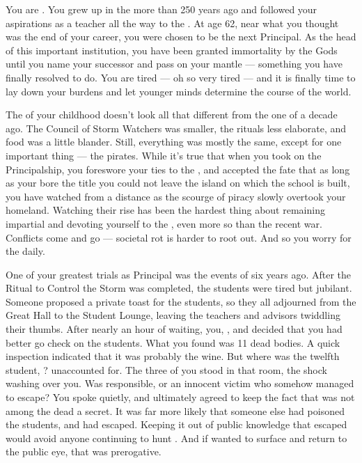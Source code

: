 \documentclass[char]{GL2020}
\begin{document}
\name{\cPrincipal{}}

You are \cPrincipal{\intro}. You grew up in the \pShip{} more than 250 years ago and followed your aspirations as a teacher all the way to the \pSchool{}. At age 62, near what you thought was the end of your career, you were chosen to be the next Principal. As the head of this important institution, you have been granted immortality by the Gods until you name your successor and pass on your mantle — something you have finally resolved to do. You are tired — oh so very tired — and it is finally time to lay down your burdens and let younger minds determine the course of the world.

The \pShip{} of your childhood doesn't look all that different from the one of a decade ago. The Council of Storm Watchers was smaller, the rituals less elaborate, and food was a little blander. Still, everything was mostly the same, except for one important thing — the pirates. While it's true that when you took on the Principalship, you foreswore your ties to the \pShippies{}, and accepted the fate that as long as your bore the title you could not leave the island on which the school is built, you have watched from a distance as the scourge of piracy slowly overtook your homeland. Watching their rise has been the hardest thing about remaining impartial and devoting yourself to the \pSc{}, even more so than the recent war. Conflicts come and go — societal rot is harder to root out. And so you worry for the \pShip{} daily.

One of your greatest trials as Principal was the events of six years ago. After the Ritual to Control the Storm was completed, the students were tired but jubilant. Someone proposed a private toast for the students, so they all adjourned from the Great Hall to the Student Lounge, leaving the teachers and advisors twiddling their thumbs. After nearly an hour of waiting, you, \cDiplomat{\intro}, and \cMusic{\intro} decided that you had better go check on the students. What you found was 11 dead bodies. A quick inspection indicated that it was probably the wine. But where was the twelfth student, \cKidScientist{\intro}? \cKidScientist{\Theywere} unaccounted for. The three of you stood in that room, the shock washing over you. Was \cKidScientist{} responsible, or \cKidScientist{\were} \cKidScientist{\they} an innocent victim who somehow managed to escape? You spoke quietly, and ultimately agreed to keep the fact that \cKidScientist{} was not among the dead a secret. It was far more likely that someone else had poisoned the students, and \cKidScientist{} had escaped. Keeping it out of public knowledge that \cKidScientist{\they} escaped would avoid anyone continuing to hunt \cKidScientist{\them}. And if \cKidScientist{\they} wanted to surface and return to the public eye, that was \cKidScientist{\their} prerogative.
\end{document}
